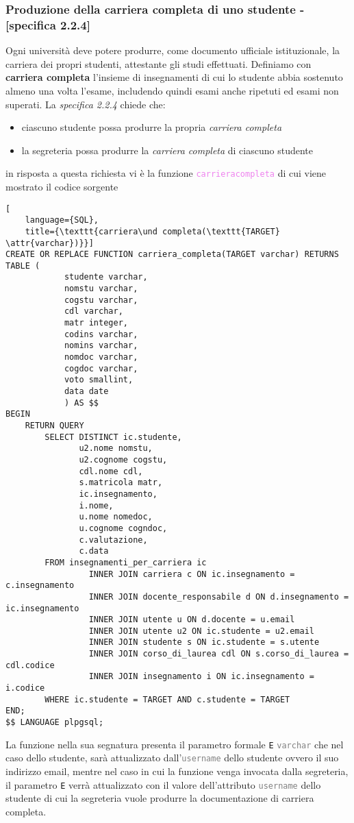 \documentclass{article}
\newcommand{\attr}[1]{\texttt{\textcolor{gray}{#1}}}
\newcommand{\sqlfunc}[1]{\texttt{\textcolor{violet}{#1}}}
\newcommand{\und}[0]{\textunderscore}
\begin{document}
\subsubsection{Produzione della carriera completa di uno studente - [specifica 2.2.4]}
Ogni università deve potere produrre, come documento ufficiale istituzionale, la carriera dei propri studenti, attestante gli studi effettuati. Definiamo con \textbf{carriera completa} l'insieme di insegnamenti di cui lo studente abbia sostenuto almeno una volta l'esame, includendo quindi esami anche ripetuti ed esami non superati.
La \textit{specifica 2.2.4} chiede che:
\begin{itemize}
    \item ciascuno studente possa produrre la propria \textit{carriera completa}
    \item la segreteria possa produrre la \textit{carriera completa} di ciascuno studente
\end{itemize}
in risposta a questa richiesta vi è la funzione \sqlfunc{carriera\und completa} di cui viene mostrato il codice sorgente
\begin{lstlisting}[
    language={SQL},
    title={\texttt{carriera\und completa(\texttt{TARGET} \attr{varchar})}}]
CREATE OR REPLACE FUNCTION carriera_completa(TARGET varchar) RETURNS TABLE (
            studente varchar,
            nomstu varchar,
            cogstu varchar,
            cdl varchar,
            matr integer,
            codins varchar,
            nomins varchar,
            nomdoc varchar,
            cogdoc varchar,
            voto smallint,
            data date
            ) AS $$
BEGIN
    RETURN QUERY
        SELECT DISTINCT ic.studente,
               u2.nome nomstu,
               u2.cognome cogstu,
               cdl.nome cdl,
               s.matricola matr,
               ic.insegnamento,
               i.nome,
               u.nome nomedoc,
               u.cognome cogndoc,
               c.valutazione,
               c.data
        FROM insegnamenti_per_carriera ic
                 INNER JOIN carriera c ON ic.insegnamento = c.insegnamento
                 INNER JOIN docente_responsabile d ON d.insegnamento = ic.insegnamento
                 INNER JOIN utente u ON d.docente = u.email
                 INNER JOIN utente u2 ON ic.studente = u2.email
                 INNER JOIN studente s ON ic.studente = s.utente
                 INNER JOIN corso_di_laurea cdl ON s.corso_di_laurea = cdl.codice
                 INNER JOIN insegnamento i ON ic.insegnamento = i.codice
        WHERE ic.studente = TARGET AND c.studente = TARGET
END;
$$ LANGUAGE plpgsql;
\end{lstlisting}
La funzione nella sua segnatura presenta il parametro formale \texttt{E} \attr{varchar} che nel caso dello studente, sarà attualizzato dall'\attr{username} dello studente ovvero il suo indirizzo email, mentre nel caso in cui la funzione venga invocata dalla segreteria, il parametro \texttt{E} verrà attualizzato con il valore dell'attributo \attr{username} dello studente di cui la segreteria vuole produrre la documentazione di carriera completa.
\end{document}
